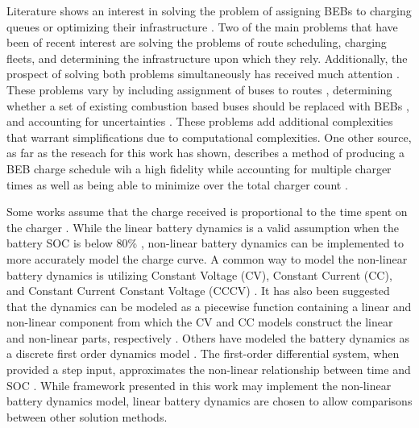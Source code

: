 \documentclass[11pt,a4paper,final]{article}
\begin{document}
Literature shows an interest in solving the problem of assigning BEBs to charging queues or optimizing their
infrastructure \cite{wei-2018-optim-spatio,sebastiani-2016-evaluat-elect,hoke-2014-accoun-lithium,wang-2017-elect-vehic}. Two of the main problems that have been of recent interest are
solving the problems of route scheduling, charging fleets, and determining the infrastructure upon which they rely.
Additionally, the prospect of solving both problems simultaneously has received much attention
\cite{wei-2018-optim-spatio,sebastiani-2016-evaluat-elect,hoke-2014-accoun-lithium,wang-2017-elect-vehic}. These
problems vary by including assignment of buses to routes \cite{rinaldi-2020-mixed-fleet,zhou-2020-collab-optim,tang-2019-robus-sched,li-2014-trans-bus}, determining whether a set of existing combustion based buses should be
replaced with BEBs \cite{zhou-2020-bi-objec,duan-2021-refor-mixed,rinaldi-2020-mixed-fleet,zhou-2020-collab-optim}, and accounting for uncertainties \cite{bie-2021-optim-elect,duan-2021-refor-mixed,tang-2019-robus-sched,ursavas-2016-optim-polic}. These problems add additional complexities that warrant
simplifications due to computational complexities. One other source, as far as the reseach for this work has shown,
describes a method of producing a BEB charge schedule wih a high fidelity while accounting for multiple charger times as
well as being able to minimize over the total charger count \cite{whitaker-2023-a-network}.

Some works assume that the charge received is proportional to the time spent on the charger
\cite{liu-2020-batter-elect,yang-2018-charg-sched}. While the linear battery dynamics is a valid assumption when the
battery SOC is below 80\% \cite{liu-2020-batter-elect}, non-linear battery dynamics can be implemented to more
accurately model the charge curve. A common way to model the non-linear battery dynamics is utilizing Constant Voltage
(CV), Constant Current (CC), and Constant Current Constant Voltage (CCCV) \cite{abdollahi-2016-optim-batter,chen-2008-desig-grey}. It has also been suggested that the dynamics can be modeled as a piecewise function containing a
linear and non-linear component from which the CV and CC models construct the linear and non-linear parts, respectively
\cite{zhang-2021-optim-elect,abdollahi-2016-optim-batter}. Others have modeled the battery dynamics as a discrete
first order dynamics model \cite{whitaker-2023-a-network}. The first-order differential system, when provided a step
input, approximates the non-linear relationship between time and SOC \cite{whitaker-2023-a-network}. While framework
presented in this work may implement the non-linear battery dynamics model, linear battery dynamics are chosen to allow
comparisons between other solution methods.
\end{document}

